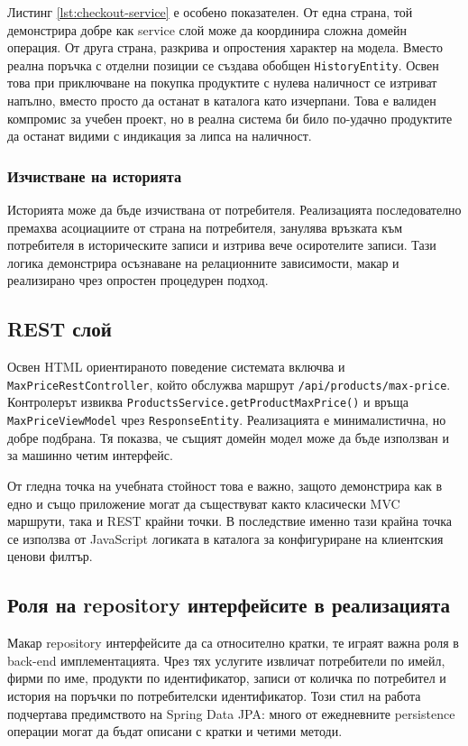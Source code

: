Листинг \ref{lst:checkout-service} е особено показателен. От една страна, той демонстрира добре как service слой може да координира сложна домейн операция. От друга страна, разкрива и опростения характер на модела. Вместо реална поръчка с отделни позиции се създава обобщен \texttt{HistoryEntity}. Освен това при приключване на покупка продуктите с нулева наличност се изтриват напълно, вместо просто да останат в каталога като изчерпани. Това е валиден компромис за учебен проект, но в реална система би било по-удачно продуктите да останат видими с индикация за липса на наличност.

\subsubsection{Изчистване на историята}

Историята може да бъде изчиствана от потребителя. Реализацията последователно премахва асоциациите от страна на потребителя, занулява връзката към потребителя в историческите записи и изтрива вече осиротелите записи. Тази логика демонстрира осъзнаване на релационните зависимости, макар и реализирано чрез опростен процедурен подход.

\subsection{REST слой}

Освен HTML ориентираното поведение системата включва и \texttt{MaxPriceRestController}, който обслужва маршрут \texttt{/api/products/max-price}. Контролерът извиква \texttt{ProductsService.getProductMaxPrice()} и връща \texttt{MaxPriceViewModel} чрез \texttt{ResponseEntity}. Реализацията е минималистична, но добре подбрана. Тя показва, че същият домейн модел може да бъде използван и за машинно четим интерфейс.

От гледна точка на учебната стойност това е важно, защото демонстрира как в едно и също приложение могат да съществуват както класически MVC маршрути, така и REST крайни точки. В последствие именно тази крайна точка се използва от JavaScript логиката в каталога за конфигуриране на клиентския ценови филтър.

\subsection{Роля на repository интерфейсите в реализацията}

Макар repository интерфейсите да са относително кратки, те играят важна роля в back-end имплементацията. Чрез тях услугите извличат потребители по имейл, фирми по име, продукти по идентификатор, записи от количка по потребител и история на поръчки по потребителски идентификатор. Този стил на работа подчертава предимството на Spring Data JPA: много от ежедневните persistence операции могат да бъдат описани с кратки и четими методи.

